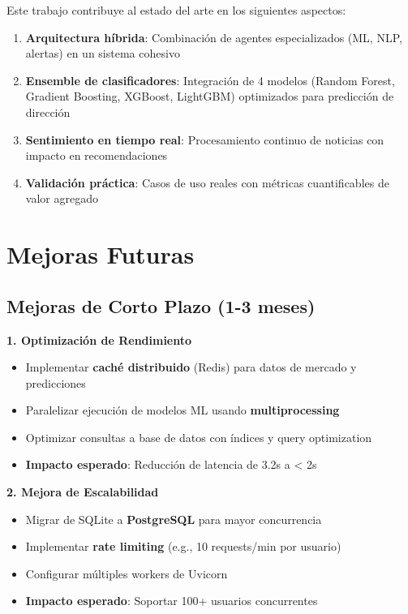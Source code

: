 \documentclass[12pt,a4paper]{report}
\begin{document}
Este trabajo contribuye al estado del arte en los siguientes aspectos:

\begin{enumerate}
    \item \textbf{Arquitectura híbrida}: Combinación de agentes especializados (ML, NLP, alertas) en un sistema cohesivo
    \item \textbf{Ensemble de clasificadores}: Integración de 4 modelos (Random Forest, Gradient Boosting, XGBoost, LightGBM) optimizados para predicción de dirección
    \item \textbf{Sentimiento en tiempo real}: Procesamiento continuo de noticias con impacto en recomendaciones
    \item \textbf{Validación práctica}: Casos de uso reales con métricas cuantificables de valor agregado
\end{enumerate}

\section{Mejoras Futuras}

\subsection{Mejoras de Corto Plazo (1-3 meses)}

\textbf{1. Optimización de Rendimiento}
\begin{itemize}
    \item Implementar \textbf{caché distribuido} (Redis) para datos de mercado y predicciones
    \item Paralelizar ejecución de modelos ML usando \textbf{multiprocessing}
    \item Optimizar consultas a base de datos con índices y query optimization
    \item \textbf{Impacto esperado}: Reducción de latencia de 3.2s a < 2s
\end{itemize}

\textbf{2. Mejora de Escalabilidad}
\begin{itemize}
    \item Migrar de SQLite a \textbf{PostgreSQL} para mayor concurrencia
    \item Implementar \textbf{rate limiting} (e.g., 10 requests/min por usuario)
    \item Configurar múltiples workers de Uvicorn
    \item \textbf{Impacto esperado}: Soportar 100+ usuarios concurrentes
\end{itemize}
\end{document}
